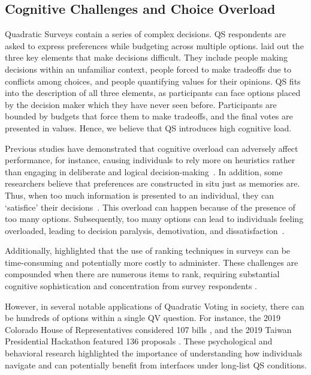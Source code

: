 \subsection{Cognitive Challenges and Choice Overload}
Quadratic Surveys contain a series of complex decisions. QS respondents are asked to express preferences while budgeting across multiple options. \textcite{lichtensteinConstructionPreference2006} laid out the three key elements that make decisions difficult. They include people making decisions within an unfamiliar context, people forced to make tradeoffs due to conflicts among choices, and people quantifying values for their opinions. QS fits into the description of all three elements, as participants can face options placed by the decision maker which they have never seen before. Participants are bounded by budgets that force them to make tradeoffs, and the final votes are presented in values. Hence, we believe that QS introduces high cognitive load.

Previous studies have demonstrated that cognitive overload can adversely affect performance, for instance, causing individuals to rely more on heuristics rather than engaging in deliberate and logical decision-making~\cite{daniel2017thinking}. In addition, some researchers believe that preferences are constructed in situ just as memories are. Thus, when too much information is presented to an individual, they can `satisfice' their decisions~\cite{simonBehavioralModelRational1955, payneAdaptiveStrategySelection1988, tverskyJudgmentsRepresentativeness}. This overload can happen because of the presence of too many options. Subsequently, too many options can lead to individuals feeling overloaded, leading to decision paralysis, demotivation, and dissatisfaction~\cite{iyengarWhenChoiceDemotivating2000}. 

Additionally, \textcite{alwinMeasurementValuesSurveys1985} highlighted that the use of ranking techniques in surveys can be time-consuming and potentially more costly to administer. These challenges are compounded when there are numerous items to rank, requiring substantial cognitive sophistication and concentration from survey respondents \cite{featherMeasurementValuesEffects1973}.

However, in several notable applications of Quadratic Voting in society, there can be hundreds of options within a single QV question. For instance, the 2019 Colorado House of Representatives considered 107 bills \cite{NewWayVoting}, and the 2019 Taiwan Presidential Hackathon featured 136 proposals \cite{QuadraticVotingFrontend2022}. These psychological and behavioral research highlighted the importance of understanding how individuals navigate and can potentially benefit from interfaces under long-list QS conditions.



